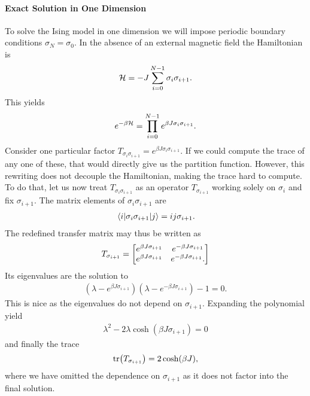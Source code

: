 \paragraph{Exact Solution in One Dimension}
To solve the Ising model in one dimension we will impose periodic boundary conditions $\sigma_{N} = \sigma_{0}$. In the absence of an external magnetic field the Hamiltonian is
\begin{align*}
	\mathcal{H} = -J\sum\limits_{i = 0}^{N - 1}\sigma_{i}\sigma_{i + 1}.
\end{align*}
This yields
\begin{align*}
	e^{-\beta\mathcal{H}} = \prod\limits_{i = 0}^{N - 1}e^{\beta J\sigma_{i}\sigma_{i + 1}}.
\end{align*}
Consider one particular factor $T_{\sigma_{i}\sigma_{i + 1}} = e^{\beta J\sigma_{i}\sigma_{i + 1}}$. If we could compute the trace of any one of these, that would directly give us the partition function. However, this rewriting does not decouple the Hamiltonian, making the trace hard to compute. To do that, let us now treat $T_{\sigma_{i}\sigma_{i + 1}}$ as an operator $T_{\sigma_{i + 1}}$ working solely on $\sigma_{i}$ and fix $\sigma_{i + 1}$. The matrix elements of $\sigma_{i}\sigma_{i + 1}$ are
\begin{align*}
	\mel{i}{\sigma_{i}\sigma_{i + 1}}{j} = ij\sigma_{i + 1}.
\end{align*}
The redefined transfer matrix may thus be written as
\begin{align*}
	T_{\sigma_{i + 1}} =
	\mqty[
		e^{\beta J \sigma_{i + 1}} & e^{-\beta J \sigma_{i + 1}} \\
		e^{\beta J \sigma_{i + 1}} & e^{-\beta J \sigma_{i + 1}}.
	]
\end{align*}
Its eigenvalues are the solution to
\begin{align*}
	\left(\lambda - e^{\beta J \sigma_{i + 1}}\right)\left(\lambda - e^{-\beta J \sigma_{i + 1}}\right) - 1 = 0.
\end{align*}
This is nice as the eigenvalues do not depend on $\sigma_{i + 1}$. Expanding the polynomial yield
\begin{align*}
	\lambda^{2} - 2\lambda\cosh(\beta J \sigma_{i + 1}) = 0
\end{align*}
and finally the trace
\begin{align*}
	\tr(T_{\sigma_{i + 1}}) = 2\cosh(\beta J),
\end{align*}
where we have omitted the dependence on $\sigma_{i + 1}$ as it does not factor into the final solution.

